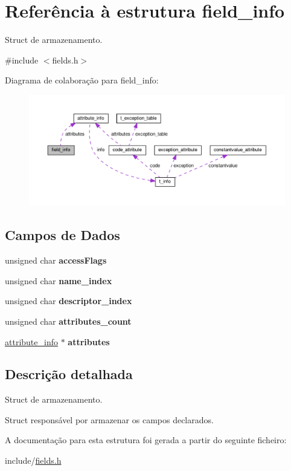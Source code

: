 \hypertarget{structfield__info}{}\section{Referência à estrutura field\+\_\+info}
\label{structfield__info}


Struct de armazenamento.  




{\ttfamily \#include $<$fields.\+h$>$}



Diagrama de colaboração para field\+\_\+info\+:
\nopagebreak
\begin{figure}[H]
\begin{center}
\leavevmode
\includegraphics[width=350pt]{structfield__info__coll__graph}
\end{center}
\end{figure}
\subsection*{Campos de Dados}
\begin{DoxyCompactItemize}
\item 
\mbox{\label{structfield__info_a52647ac149308d5ef9f010689400ee4c}} 
unsigned char {\bfseries access\+Flags}
\item 
\mbox{\label{structfield__info_abb3389c726c0efe891c2d26567ecea49}} 
unsigned char {\bfseries name\+\_\+index}
\item 
\mbox{\label{structfield__info_afe39e4e9e594dfce15635923ad7d1f06}} 
unsigned char {\bfseries descriptor\+\_\+index}
\item 
\mbox{\label{structfield__info_a89ea1703d384244c336899c3b04850f9}} 
unsigned char {\bfseries attributes\+\_\+count}
\item 
\mbox{\label{structfield__info_afdda114944ae5eaae78c237f99257108}} 
\hyperlink{structattribute__info}{attribute\+\_\+info} $\ast$ {\bfseries attributes}
\end{DoxyCompactItemize}


\subsection{Descrição detalhada}
Struct de armazenamento. 

Struct responsável por armazenar os campos declarados. 

A documentação para esta estrutura foi gerada a partir do seguinte ficheiro\+:\begin{DoxyCompactItemize}
\item 
include/\hyperlink{fields_8h}{fields.\+h}\end{DoxyCompactItemize}
